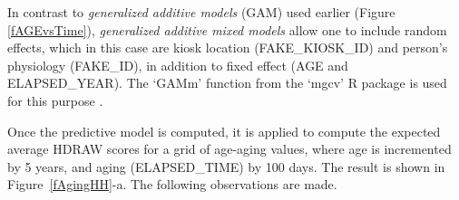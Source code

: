 \documentclass{cta-author}%
\newcommand{\cmt}[1]{}
\begin{document}
In contrast to {\it generalized additive  models} (GAM)  used earlier (Figure \ref{fAGEvsTime}), 
{\it generalized additive mixed models} allow one to include random effects, which in this case are kiosk location (FAKE\_KIOSK\_ID) and person's physiology (FAKE\_ID), in addition to fixed effect (AGE and ELAPSED\_YEAR).
The `GAMm' function from the `mgcv' R package is used for this purpose \cite{R-GAM}.

\cmt{
Using the `mgcv` R package \cite{R-GAM}, the relationship between the effects and the output value (HDRAW) is defined by the following 
formula:
{\scriptsize  
\begin{verbatim}  
model = GAMm( HDRAW ~ te(ELAPSED_TIME, AGE), data=OPS_XING,
              random=list(FAKE_ID=~1, FAKE_KIOSK_ID=~1) ) 
\end{verbatim}
}


In this formula,  {\tt te()} is used to  apply a tensor product smooth to obtain better smoothing for the function on the marginal values.
}

Once the predictive model is computed, it is applied to compute the  expected average HDRAW scores for a grid of age-aging values,  where age is incremented by 5 years, and aging (ELAPSED\_TIME) by 100 days. The result 
is shown in Figure~\ref{fAgingHH}-a.
The following  observations are made.

\cmt{
shows the  heatmap of  HDNORM scores for different Age at Passage  and different number of years since enrollment (ELAPSED\_YEAR).
The top image shows interpolated (i.e., averaged between adjacent bins) mathematical average of HDNORM for each `age'-`aging' group. 
The bottom image shows average  HDNORM scores for different Age and ELAPSED\_YEAR computed using generalized additive model regression. Data from all kiosks and all cameras are used. 

}
\end{document}
